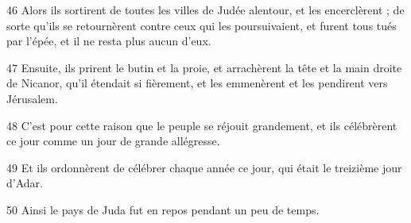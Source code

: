 \par 46 Alors ils sortirent de toutes les villes de Judée alentour, et les encerclèrent ; de sorte qu'ils se retournèrent contre ceux qui les poursuivaient, et furent tous tués par l'épée, et il ne resta plus aucun d'eux.
\par 47 Ensuite, ils prirent le butin et la proie, et arrachèrent la tête et la main droite de Nicanor, qu'il étendait si fièrement, et les emmenèrent et les pendirent vers Jérusalem.
\par 48 C'est pour cette raison que le peuple se réjouit grandement, et ils célébrèrent ce jour comme un jour de grande allégresse.
\par 49 Et ils ordonnèrent de célébrer chaque année ce jour, qui était le treizième jour d'Adar.
\par 50 Ainsi le pays de Juda fut en repos pendant un peu de temps.


